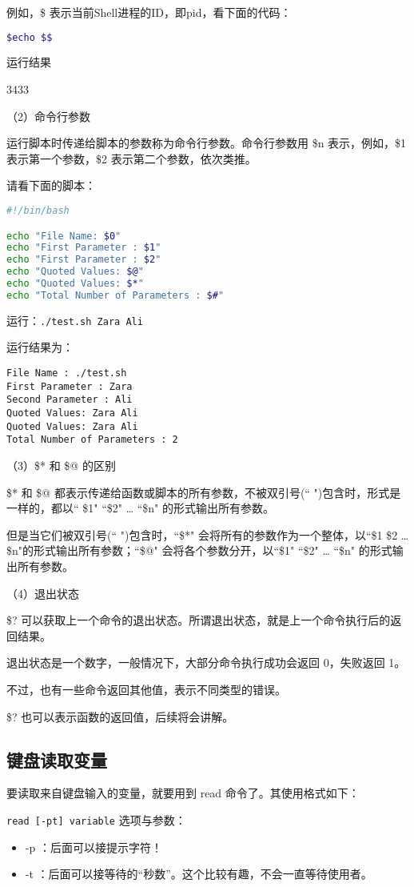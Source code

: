 例如，\$ 表示当前Shell进程的ID，即pid，看下面的代码：
\begin{lstlisting}[language=sh]
$echo $$
\end{lstlisting}
运行结果

3433


（2）命令行参数

运行脚本时传递给脚本的参数称为命令行参数。命令行参数用 \$n 表示，例如，\$1 表示第一个参数，\$2 表示第二个参数，依次类推。

请看下面的脚本：
\begin{lstlisting}[language=sh]
#!/bin/bash

echo "File Name: $0"
echo "First Parameter : $1"
echo "First Parameter : $2"
echo "Quoted Values: $@"
echo "Quoted Values: $*"
echo "Total Number of Parameters : $#"
\end{lstlisting}

运行：\verb|./test.sh Zara Ali|

运行结果为：
\begin{verbatim}
File Name : ./test.sh
First Parameter : Zara
Second Parameter : Ali
Quoted Values: Zara Ali
Quoted Values: Zara Ali
Total Number of Parameters : 2
\end{verbatim}


（3）\$* 和 \$@ 的区别

\$* 和 \$@ 都表示传递给函数或脚本的所有参数，不被双引号(`` ")包含时，形式是一样的，都以`` \$1" ``\$2" … ``\$n" 的形式输出所有参数。

但是当它们被双引号(`` ")包含时，``\$*" 会将所有的参数作为一个整体，以``\$1 \$2 … \$n"的形式输出所有参数；``\$@" 会将各个参数分开，以``\$1" ``\$2" … ``\$n" 的形式输出所有参数。


（4）退出状态

\$? 可以获取上一个命令的退出状态。所谓退出状态，就是上一个命令执行后的返回结果。

退出状态是一个数字，一般情况下，大部分命令执行成功会返回 0，失败返回 1。

不过，也有一些命令返回其他值，表示不同类型的错误。

\$? 也可以表示函数的返回值，后续将会讲解。



\subsection{键盘读取变量}
要读取来自键盘输入的变量，就要用到 read 命令了。其使用格式如下：

\verb|read [-pt] variable|
选项与参数：
\begin{itemize}
\item -p  ：后面可以接提示字符！
\item -t  ：后面可以接等待的“秒数”。这个比较有趣，不会一直等待使用者。
\end{itemize}

